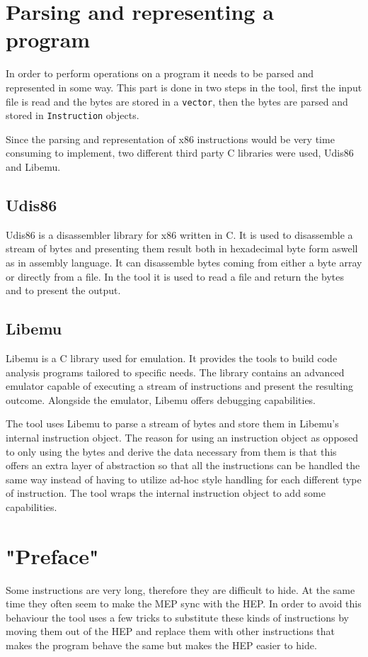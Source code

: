 \documentclass[11pt,twoside]{eitExjobb}
\begin{document}
\section{Parsing and representing a program}
In order to perform operations on a program it needs to be parsed and represented in some way. This part is done in two steps in the tool, first the input file is read and the bytes are stored in a \texttt{vector}, then the bytes are parsed and stored in \texttt{Instruction} objects. 

Since the parsing and representation of x86 instructions would be very time consuming to implement, two different third party C libraries were used, Udis86 and Libemu. 

\subsection{Udis86}
Udis86 is a disassembler library for x86 written in C. It is used to disassemble a stream of bytes and presenting them result both in hexadecimal byte form aswell as in assembly language. It can disassemble bytes coming from either a byte array or directly from a file. In the tool it is used to read a file and return the bytes and to present the output.\cite{udis}


\subsection{Libemu}
Libemu is a C library used for emulation. It provides the tools to build code analysis programs tailored to specific needs. The library contains an advanced emulator capable of executing a stream of instructions and present the resulting outcome. Alongside the emulator, Libemu offers debugging capabilities.

The tool uses Libemu to parse a stream of bytes and store them in Libemu's internal instruction object. The reason for using an instruction object as opposed to only using the bytes and derive the data necessary from them is that this offers an extra layer of abstraction so that all the instructions can be handled the same way instead of having to utilize ad-hoc style handling for each different type of instruction. The tool wraps the internal instruction object to add some capabilities.\cite{libemu}

\section{"Preface"}
Some instructions are very long, therefore they are difficult to hide. At the same time they often seem to make the MEP sync with the HEP. In order to avoid this behaviour the tool uses a few tricks to substitute these kinds of instructions by moving them out of the HEP and replace them with other instructions that makes the program behave the same but makes the HEP easier to hide. 
\end{document}
